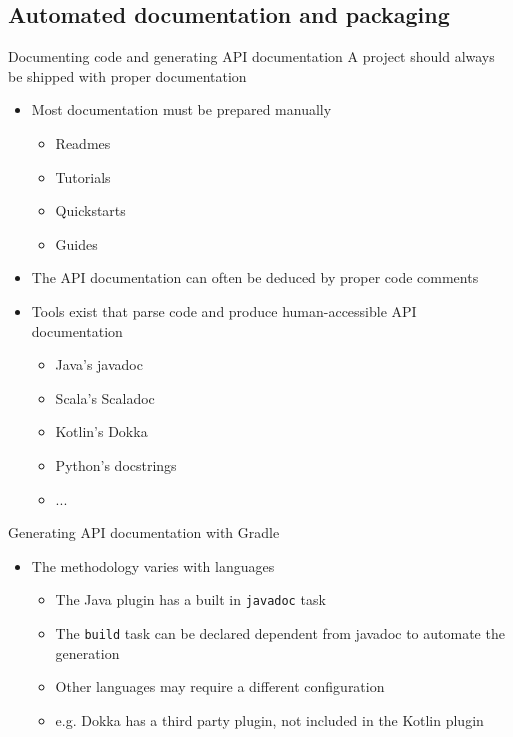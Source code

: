 \documentclass[presentation]{beamer}
\begin{document}
\subsection{Automated documentation and packaging}

\begin{frame}[fragile]{Documenting code and generating API documentation}
    A project should always be shipped with proper documentation
    \begin{itemize}
        \item Most documentation must be prepared manually
        \begin{itemize}
            \item Readmes
            \item Tutorials
            \item Quickstarts
            \item Guides
        \end{itemize}
        \item The API documentation can often be deduced by proper code comments
        \item Tools exist that parse code and produce human-accessible API documentation
        \begin{itemize}
            \item Java's javadoc
            \item Scala's Scaladoc
            \item Kotlin's Dokka
            \item Python's docstrings
            \item ...
        \end{itemize}
    \end{itemize}
\end{frame}

\begin{frame}[fragile]{Generating API documentation with Gradle}
    \begin{itemize}
        \item The methodology varies with languages
        \begin{itemize}
            \item The Java plugin has a built in \texttt{javadoc} task
            \item The \texttt{build} task can be declared dependent from javadoc to automate the generation
            \item Other languages may require a different configuration
            \item e.g. Dokka has a third party plugin, not included in the Kotlin plugin
        \end{itemize}
    \end{itemize}
\end{frame}
\end{document}
